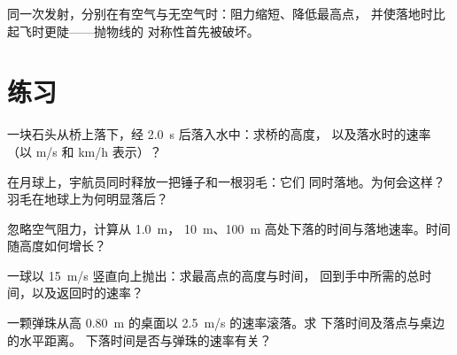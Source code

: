 \begin{omfigure}

{\small 同一次发射，分别在有空气与无空气时：阻力缩短、降低最高点，
并使落地时比起飞时更陡——抛物线的
对称性首先被破坏。}
\end{omfigure}

\section{练习}

\begin{exercise}[$\star$]\label{exo:g12:projectile-motion:1}
一块石头从桥上落下，经 \qty{2.0}{s} 后落入水中：求桥的高度，
以及落水时的速率（以 \unit{m/s} 和 \unit{km/h} 表示）？
\end{exercise}

\begin{exercise}[$\star$]\label{exo:g12:projectile-motion:2}
在月球上，宇航员同时释放一把锤子和一根羽毛：它们
同时落地。为何会这样？羽毛在地球上为何明显落后？
\end{exercise}

\begin{exercise}[$\star$]\label{exo:g12:projectile-motion:3}
忽略空气阻力，计算从 \qty{1.0}{m}，
\qty{10}{m}、\qty{100}{m} 高处下落的时间与落地速率。时间随高度如何增长？
\end{exercise}

\begin{exercise}[$\star$]\label{exo:g12:projectile-motion:4}
一球以 \qty{15}{m/s} 竖直向上抛出：求最高点的高度与时间，
回到手中所需的总时间，以及返回时的速率？
\end{exercise}

\begin{exercise}[$\star$]\label{exo:g12:projectile-motion:5}
一颗弹珠从高 \qty{0.80}{m} 的桌面以 \qty{2.5}{m/s} 的速率滚落。求
下落时间及落点与桌边的水平距离。
下落时间是否与弹珠的速率有关？
\end{exercise}

